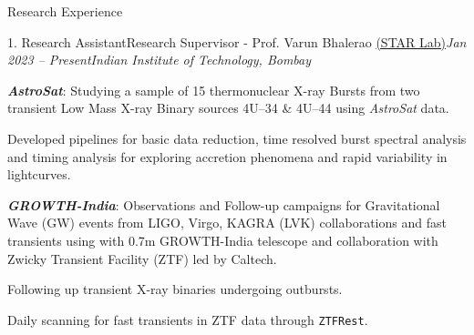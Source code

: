 \vspace{-0.7em}
\begin{section}{Research Experience}
    \begin{subsection}{1. Research Assistant}{Research Supervisor - Prof. Varun Bhalerao \href{https://www.star-iitb.in/home}{(STAR Lab)}}{\textit{Jan 2023 -- Present}}{\textit{Indian Institute of Technology, Bombay}}
        \vspace{0.5em}
            \item \textit{\textbf{AstroSat}}: Studying a sample of 15 thermonuclear X-ray Bursts from two transient Low Mass X-ray Binary sources 4U--34 \&  4U--44 using \textit{AstroSat} data.
            \item Developed pipelines for basic data reduction, time resolved burst spectral analysis and timing analysis for exploring accretion phenomena and rapid variability in lightcurves.
            
        \vspace{0.5em}
        
            \item \textit{\textbf{GROWTH-India}}: Observations and Follow-up campaigns for Gravitational Wave (GW) events from LIGO, Virgo, KAGRA (LVK) collaborations and fast transients using with 0.7m GROWTH-India telescope and collaboration with Zwicky Transient Facility (ZTF) led by Caltech. 
            \item Following up transient X-ray binaries undergoing outbursts.
            \item Daily scanning for fast transients in ZTF data through \texttt{ZTFRest}.
            
            

\end{subsection}
\end{section}
